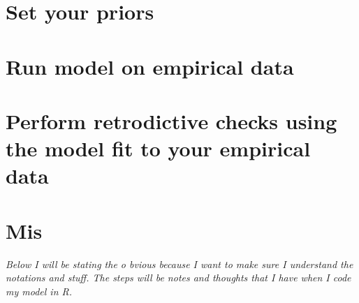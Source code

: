\documentclass[a4paper,12pt]{article}
\begin{document}
\section{Set your priors}

\section{Run model on empirical data}

\section{Perform retrodictive checks using the model fit to your empirical data}

\section{Mis}

\newpage
\textit{Below I will be stating the o bvious because I want to make sure I understand the notations and stuff. The steps will be notes and thoughts that I have when I code my model in R.}
\end{document}

